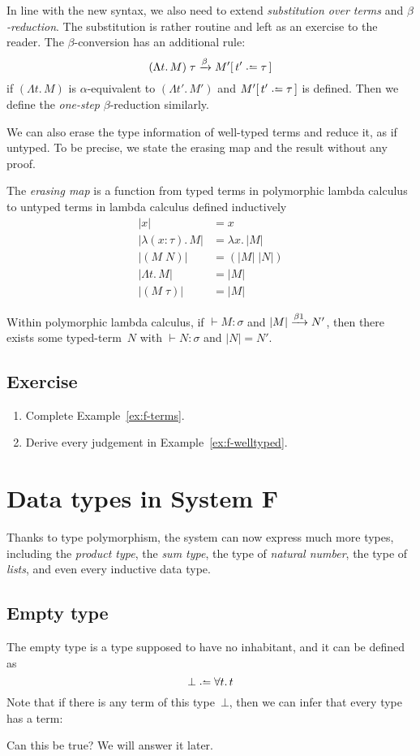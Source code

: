 In line with the new syntax, we also need to extend \emph{substitution over
  terms} and \emph{$\beta$-reduction}. The substitution is rather routine and
left as an exercise to the reader.  The $\beta$-conversion has an additional
rule:
\[
  (\Lambda t.\, M)\;\tau \xrightarrow{\beta} M' \subst{t'}{\tau}
\]
if $(\Lambda t.\, M)$ is $\alpha$-equivalent to $(\Lambda t'.\, M')$
and $M' \subst{t'}{\tau}$ is defined.
Then we define the \emph{one-step} $\beta$-reduction similarly.

We can also erase the type information of well-typed terms and reduce it, as if
untyped. To be precise, we state the erasing map and the result without any
proof.
\begin{definition}
  The \emph{erasing map} is a function from typed terms in polymorphic lambda
  calculus to untyped terms in lambda calculus defined inductively 
  \begin{align*}
    |x| & = x \\
    |\lambda (x : \tau).\,M| & = \lambda x.\, |M| \\
    |(M\;N)| & = (|M|\;|N|) \\
    |\Lambda t.\, M| & = |M| \\
    |(M\;\tau)| & = |M|
  \end{align*}
\end{definition}
\begin{theorem}
  Within polymorphic lambda calculus, if ${}\vdash M : \sigma$ and $|M|
  \onereduce N'$, then there exists some typed-term~$N$ with
  ${}\vdash N : \sigma$ and $|N| = N'$.
\end{theorem}
\subsection*{Exercise}
\begin{enumerate}
  \item Complete Example~\ref{ex:f-terms}.
  \item Derive every judgement in Example~\ref{ex:f-welltyped}.
\end{enumerate}
\section{Data types in System F}
Thanks to type polymorphism, the system can now express much more types,
including the \emph{product type}, the \emph{sum type}, the type of
\emph{natural number}, the type of \emph{lists}, and even every inductive data
type.
\subsection{Empty type}
The empty type is a type supposed to have no inhabitant, and it can be defined
as
\[
  \bot \defeq \forall t.\,t
\]
Note that if there is any term of this type~$\bot$, then we can infer that every
type has a term:
\begin{prooftree}
\end{prooftree}
Can this be true? We will answer it later.
